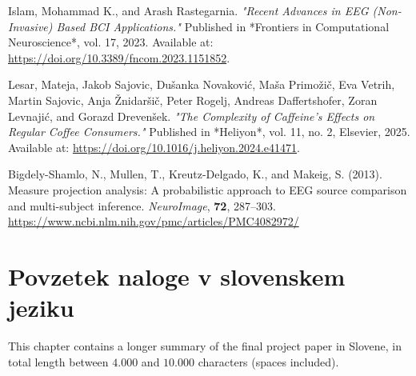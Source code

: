 \documentclass[12pt,a4paper,titlepage,openany]{report}
\begin{document}
\begin{thebibliography}{99}
     Islam, Mohammad K., and Arash Rastegarnia. 
     \emph{"Recent Advances in EEG (Non-Invasive) Based BCI Applications."} 
     Published in *Frontiers in Computational Neuroscience*, vol. 17, 2023. Available at: \url{https://doi.org/10.3389/fncom.2023.1151852}.

     Lesar, Mateja, Jakob Sajovic, Dušanka Novaković, Maša Primožič, Eva Vetrih, Martin Sajovic, Anja Žnidaršič, Peter Rogelj, Andreas Daffertshofer, Zoran Levnajić, and Gorazd Drevenšek.  
     \emph{"The Complexity of Caffeine's Effects on Regular Coffee Consumers."}  
     Published in *Heliyon*, vol. 11, no. 2, Elsevier, 2025. Available at: \url{https://doi.org/10.1016/j.heliyon.2024.e41471}.

    Bigdely-Shamlo, N., Mullen, T., Kreutz-Delgado, K., and Makeig, S. (2013).
    Measure projection analysis: A probabilistic approach to EEG source comparison and multi-subject inference.
    \textit{NeuroImage}, \textbf{72}, 287--303.
    \url{https://www.ncbi.nlm.nih.gov/pmc/articles/PMC4082972/}
    
    
     
\end{thebibliography}
\newpage


\chapter{Povzetek naloge v slovenskem jeziku}
\thispagestyle{fancy}

This chapter contains a longer summary of the final project paper in Slovene,
in total length between $4.000$ and $10.000$ characters (spaces included).


\end{document}
